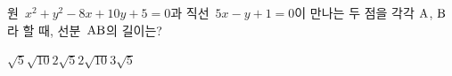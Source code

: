 원~$x^2+y^2-8x+10y+5=0$과 직선~$5x-y+1=0$이 만나는 두 점을 각각 $\mathrm{A}$, $\mathrm{B}$라 할 때, 선분~$\mathrm{AB}$의 길이는?
\begin{choices32}{$\sqrt{5}$}{$\sqrt{10}$}{$2\sqrt{5}$}{$2\sqrt{10}$}{$3\sqrt{5}$}\end{choices32}
